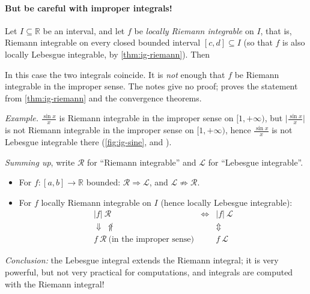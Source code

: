 \paragraph{But be careful with improper integrals!}

\begin{remark}\label{rem:ig-improper}
Let $I\subseteq\mathbb R$ be an interval, and let $f$ be \emph{locally Riemann integrable} on
$I$, that is, Riemann integrable on every closed bounded interval $[c,d]\subseteq I$ (so that $f$
is also locally Lebesgue integrable, by \cref{thm:ig-riemann}). Then
\begin{center}
\end{center}
In this case the two integrals coincide. It is \emph{not} enough that $f$ be Riemann integrable
in the improper sense. The notes give no proof;  proves the statement
from \cref{thm:ig-riemann} and the convergence theorems.

\emph{Example.} $\frac{\sin x}{x}$ is Riemann integrable in the improper sense on $[1,+\infty)$,
but $\big|\frac{\sin x}{x}\big|$ is not Riemann integrable in the improper sense on
$[1,+\infty)$, hence $\frac{\sin x}x$ is not Lebesgue integrable there
(\cref{fig:ig-sine},  and ).

\emph{Summing up}, write $\mathcal R$ for ``Riemann integrable'' and $\mathcal L$ for
``Lebesgue integrable''.
\begin{itemize}
  \item For $f:[a,b]\to\mathbb R$ bounded: $\mathcal R\Rightarrow\mathcal L$, and
    $\mathcal L\not\Rightarrow\mathcal R$.
  \item For $f$ locally Riemann integrable on $I$ (hence locally Lebesgue integrable):
    \[
      \begin{array}{ccc}
        |f|\ \mathcal R & \iff & |f|\ \mathcal L\\[2pt]
        \Downarrow\ \not\Uparrow & & \Updownarrow\\[2pt]
        f\ \mathcal R\ \text{(in the improper sense)} & & f\ \mathcal L
      \end{array}
    \]
\end{itemize}
\emph{Conclusion:} the Lebesgue integral extends the Riemann integral; it is very powerful, but
not very practical for computations, and integrals are computed with the Riemann integral!
\end{remark}


